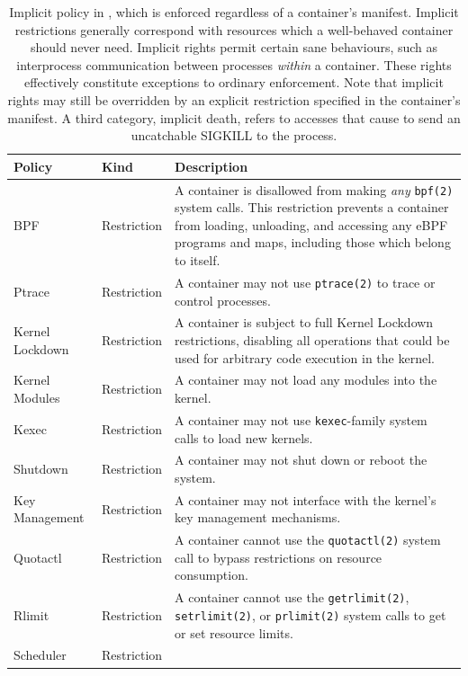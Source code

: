 \begingroup
\small
\begin{longtable}[c]{llp{25em}}
  \caption{
    Implicit policy in \bpfcontain{}, which is enforced regardless of a container's manifest. Implicit restrictions generally correspond with resources which a well-behaved container should never need. Implicit rights permit certain sane behaviours, such as interprocess communication between processes \textit{within} a container. These rights effectively constitute exceptions to ordinary enforcement. Note that implicit rights may still be overridden by an explicit restriction specified in the container's manifest. A third category, implicit death, refers to accesses that cause \bpfcontain{} to send an uncatchable SIGKILL to the process.
  }
  \label{tab:implicit}\\
  \toprule
  Policy & Kind & Description \\
  \midrule
  \endfirsthead
  BPF & Restriction &
    A container is disallowed from making \textit{any} \texttt{bpf(2)} system calls. This restriction prevents a container from loading, unloading, and accessing any eBPF programs and maps, including those which belong to \bpfcontain{} itself. \\
  Ptrace & Restriction &
    A container may not use \texttt{ptrace(2)} to trace or control processes. \\
  Kernel Lockdown & Restriction &
    A container is subject to full Kernel Lockdown \cite{lockdown} restrictions, disabling all operations that could be used for arbitrary code execution in the kernel. \\
  Kernel Modules & Restriction &
    A container may not load any modules into the kernel. \\
  Kexec & Restriction &
    A container may not use \texttt{kexec}-family system calls to load new kernels. \\
  Shutdown & Restriction &
    A container may not shut down or reboot the system. \\
  Key Management & Restriction &
    A container may not interface with the kernel's key management mechanisms. \\
  Quotactl & Restriction &
    A container cannot use the \texttt{quotactl(2)} system call to bypass restrictions on resource consumption. \\
  Rlimit & Restriction &
    A container cannot use the \texttt{getrlimit(2)}, \texttt{setrlimit(2)}, or \texttt{prlimit(2)} system calls to get or set resource limits. \\
  Scheduler & Restriction &

\end{longtable}
